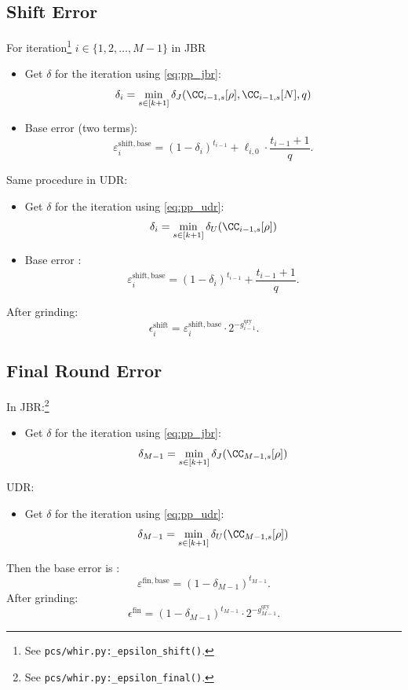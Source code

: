 \subsection{Shift Error}

For iteration\footnote{See \texttt{pcs/whir.py:\_epsilon\_shift()}.} \(i\in\{1,2,\ldots,M-1\}\) in JBR
\begin{itemize}
    \item   Get $\delta$ for the iteration using \eqref{eq:pp_jbr}:
    $$
    \delta_i =\min_{s\in[k+1]}\delta_J(\CC_{i-1,s}[\rho],\CC_{i-1,s}[N],q)
    $$
\item Base error (two terms):
\[
  \varepsilon^{\mathrm{shift,base}}_i
    = (1 - \delta_i )^{t_{i-1}}
      + \ell_{i,0} \cdot \frac{t_{i-1} + 1}{  q}.
\]

\end{itemize}

Same procedure in UDR:
\begin{itemize}
    \item   Get $\delta$ for the iteration using \eqref{eq:pp_udr}:
    $$
    \delta_i =\min_{s\in[k+1]}\delta_U(\CC_{i-1,s}[\rho])
    $$
\item Base error  :
\[
  \varepsilon^{\mathrm{shift,base}}_i
    = (1 - \delta_i )^{t_{i-1}}
      +   \frac{t_{i-1} + 1}{q}.
\]

\end{itemize}

 After grinding:
\[
  \epsilon^{\mathrm{shift}}_i
    = \varepsilon^{\mathrm{shift,base}}_i
      \cdot 2^{-g^{\mathrm{qry}}_{i-1}}.
\]


\subsection{Final Round Error}

In JBR:\footnote{See \texttt{pcs/whir.py:\_epsilon\_final()}.}
\begin{itemize}
    \item  Get $\delta$ for the iteration using \eqref{eq:pp_jbr}:
    $$
    \delta_{M-1} =\min_{s\in[k+1]}\delta_J(\CC_{M-1,s}[\rho])
    $$
\end{itemize}
UDR:
 \begin{itemize}
    \item  Get $\delta$ for the iteration using \eqref{eq:pp_udr}:
    $$
    \delta_{M-1} =\min_{s\in[k+1]}\delta_U(\CC_{M-1,s}[\rho])
    $$
\end{itemize}
Then
the base error is :
\[
  \varepsilon^{\mathrm{fin,base}}
    = (1 - \delta_{M-1})^{t_{M-1}}.
\]
After grinding:
\[
  \epsilon^{\mathrm{fin}}
  = (1 - \delta_{M-1})^{t_{M-1}}
    \cdot 2^{-g^{\mathrm{qry}}_{M-1}}.
\]
\newpage
